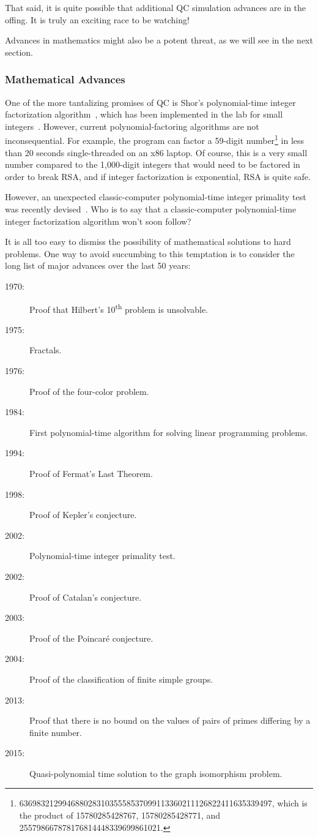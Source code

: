 That said, it is quite possible that additional QC simulation advances
are in the offing.
It is truly an exciting race to be watching!

Advances in mathematics might also be a potent threat, as we will see
in the next section.

\subsubsection{Mathematical Advances}
\label{sec:future:Mathematical Advances}

One of the more tantalizing promises of QC is Shor's
polynomial-time integer factorization
algorithm~\cite{Shor:1997:PAP:264393.264406,WikipediaShorsAlgorithm},
which has been implemented in the lab for small
integers~\cite{LievenMKVandersypen2001ShorQFactoring}.
However, current polynomial-factoring algorithms are not
inconsequential.
For example, the  program can factor a 59-digit number\footnote{
	\scriptsize
	63698321299468802831035558537099113360211126822411635339497,
	which is the product of 15780285428767, 15780285428771, and
	255798667878176814448339699861021.}
in less than 20 seconds single-threaded on an x86 laptop.
Of course, this is a very small number compared to the 1,000-digit
integers that would need to be factored in order to break RSA,
and if integer factorization is exponential, RSA is quite safe.

However, an unexpected classic-computer
polynomial-time integer primality test was recently
devised~\cite{ManindraAgrawal2004PrimesIsInP,WikipediaAKSPrimalityTest}.
Who is to say that a classic-computer polynomial-time integer
factorization algorithm won't soon follow?

It is all too easy to dismiss the possibility of mathematical solutions
to hard problems.
One way to avoid succumbing to this temptation is to consider the
long list of major advances over the last 50 years:

\begin{description}
\item[1970:] Proof that Hilbert's 10\textsuperscript{th} problem
	is unsolvable.
\item[1975:] Fractals.
\item[1976:] Proof of the four-color problem.
\item[1984:] First polynomial-time algorithm for solving linear
	programming problems.
\item[1994:] Proof of Fermat's Last Theorem.
\item[1998:] Proof of Kepler's conjecture.
\item[2002:] Polynomial-time integer primality test.
\item[2002:] Proof of Catalan's conjecture.
\item[2003:] Proof of the Poincar\'e conjecture.
\item[2004:] Proof of the classification of finite simple groups.
\item[2013:] Proof that there is no bound on the values of
	pairs of primes differing by a finite number.
\item[2015:] Quasi-polynomial time solution to the graph isomorphism
	problem.
\end{description}

